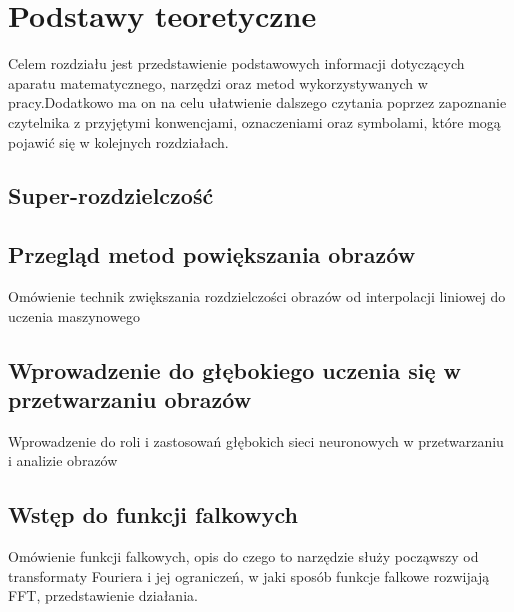 \chapter{Podstawy teoretyczne}


Celem rozdziału jest przedstawienie podstawowych informacji dotyczących aparatu matematycznego, narzędzi oraz metod wykorzystywanych w pracy.Dodatkowo ma on na celu ułatwienie dalszego czytania poprzez zapoznanie czytelnika z przyjętymi konwencjami, oznaczeniami oraz symbolami, które mogą pojawić się w kolejnych rozdziałach.

\section{Super-rozdzielczość}





\section{Przegląd metod powiększania obrazów}


Omówienie technik zwiększania rozdzielczości obrazów od interpolacji liniowej do uczenia maszynowego


\section{Wprowadzenie do głębokiego uczenia się w przetwarzaniu obrazów}


Wprowadzenie do roli i zastosowań głębokich sieci neuronowych w przetwarzaniu i analizie obrazów


\section{Wstęp do funkcji falkowych}


Omówienie funkcji falkowych, opis do czego to narzędzie służy począwszy od transformaty Fouriera i jej ograniczeń, 
w jaki sposób funkcje falkowe rozwijają FFT, przedstawienie działania.

